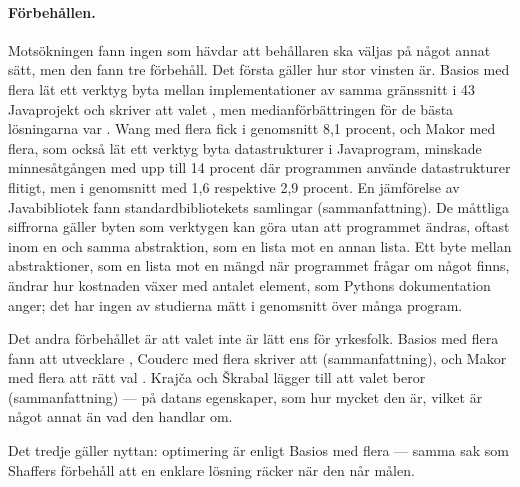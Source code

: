 \paragraph{Förbehållen.}  Motsökningen fann ingen som hävdar att
behållaren ska väljas på något annat sätt, men den fann tre förbehåll.
Det första gäller hur stor vinsten är.  Basios med flera lät ett verktyg
byta mellan implementationer av samma gränssnitt i 43 Javaprojekt och
skriver att valet , men
medianförbättringen för de bästa lösningarna var
.  Wang med flera fick i genomsnitt 8,1
procent\autocite{Wang2022Cres}, och Makor med flera, som också lät ett
verktyg byta datastrukturer i Javaprogram, minskade minnesåtgången med
upp till 14 procent där programmen använde datastrukturer flitigt, men i
genomsnitt med 1,6 respektive 2,9 procent\autocite{Makor2025Profile}.
En jämförelse av Javabibliotek fann standardbibliotekets samlingar
(sammanfattning).  De måttliga siffrorna gäller byten som verktygen kan
göra utan att programmet ändras, oftast inom en och samma abstraktion,
som en lista mot en annan lista.  Ett byte mellan abstraktioner, som en
lista mot en mängd när programmet frågar om något finns, ändrar hur
kostnaden växer med antalet element, som Pythons dokumentation
anger\autocite{PythonTimeComplexity}; det har ingen av studierna mätt
i genomsnitt över många program.

Det andra förbehållet är att valet inte är lätt ens för yrkesfolk.
Basios med flera fann att utvecklare
, Couderc med flera skriver att
(sammanfattning), och Makor med flera att rätt val
.  Krajča och Škrabal lägger till att valet beror
 (sammanfattning) --- på datans egenskaper, som
hur mycket den är, vilket är något annat än vad den handlar om.

Det tredje gäller nyttan: optimering är enligt Basios med flera
 --- samma sak som Shaffers förbehåll att en enklare
lösning räcker när den når målen.

